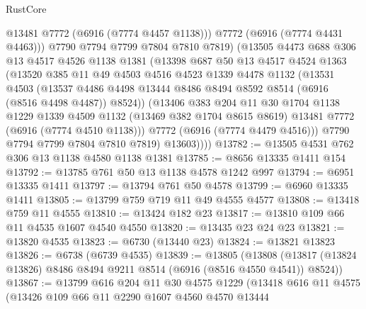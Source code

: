 \begin{lexlean}{RustCore}
\begin{coremodule}
                @13481
                @7772
                (@6916 (@7774 @4457 @1138)))
              @7772
              (@6916 (@7774 @4431 @4463)))
            @7790
            @7794
            @7799
            @7804
            @7810
            @7819)
          (@13505
            @4473
            @688
            @306
            @13
            @4517
            @4526
            @1138
            @1381
            (@13398
              @687
              @50
              @13
              @4517
              @4524
              @1363
              (@13520
                @385
                @11
                @49
                @4503
                @4516
                @4523
                @1339
                @4478
                @1132
                (@13531
                  @4503
                  (@13537
                    @4486
                    @4498
                    @13444
                    @8486
                    @8494
                    @8592
                    @8514
                    (@6916 (@8516 @4498 @4487))
                    @8524))
                (@13406
                  @383
                  @204
                  @11
                  @30
                  @1704
                  @1138
                  @1229
                  @1339
                  @4509
                  @1132
                  (@13469 @382 @1704 @8615 @8619)
                  @13481
                  @7772
                  (@6916 (@7774 @4510 @1138)))
                @7772
                (@6916 (@7774 @4479 @4516)))
              @7790
              @7794
              @7799
              @7804
              @7810
              @7819)
            @13603))))
@13782 := @13505 @4531 @762 @306 @13 @1138 @4580 @1138 @1381
@13785 := @8656 @13335 @1411 @154
@13792 := @13785 @761 @50 @13 @1138 @4578 @1242 @997
@13794 := @6951 @13335 @1411
@13797 := @13794 @761 @50 @4578
@13799 := @6960 @13335 @1411
@13805 := @13799 @759 @719 @11 @49 @4555 @4577
@13808 := @13418 @759 @11 @4555
@13810 := @13424 @182 @23
@13817 := @13810 @109 @66 @11 @4535 @1607 @4540 @4550
@13820 := @13435 @23 @24 @23
@13821 := @13820 @4535
@13823 := @6730 (@13440 @23)
@13824 := @13821 @13823
@13826 := @6738 (@6739 @4535)
@13839 := @13805
    (@13808 (@13817 (@13824 @13826) @8486 @8494 @9211 @8514 (@6916 (@8516 @4550 @4541)) @8524))
@13867 := @13799
    @616
    @204
    @11
    @30
    @4575
    @1229
    (@13418
      @616
      @11
      @4575
      (@13426
        @109
        @66
        @11
        @2290
        @1607
        @4560
        @4570
        @13444

\end{coremodule}
\end{lexlean}

